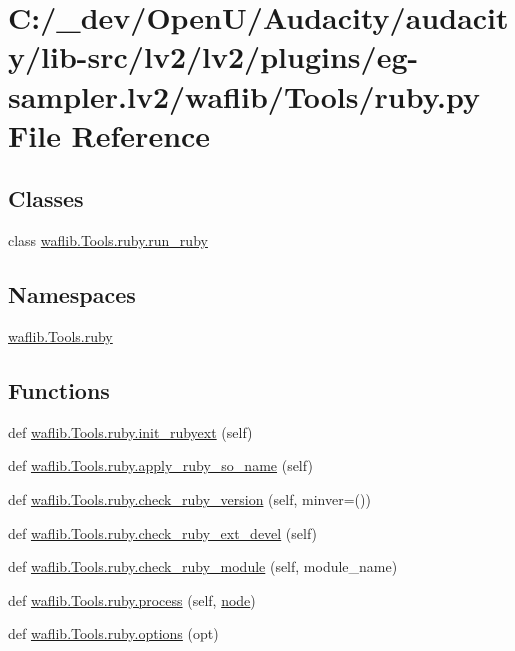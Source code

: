 \hypertarget{lv2_2plugins_2eg-sampler_8lv2_2waflib_2_tools_2ruby_8py}{}\section{C\+:/\+\_\+dev/\+Open\+U/\+Audacity/audacity/lib-\/src/lv2/lv2/plugins/eg-\/sampler.lv2/waflib/\+Tools/ruby.py File Reference}
\label{lv2_2plugins_2eg-sampler_8lv2_2waflib_2_tools_2ruby_8py}
\subsection*{Classes}
\begin{DoxyCompactItemize}
\item 
class \hyperlink{classwaflib_1_1_tools_1_1ruby_1_1run__ruby}{waflib.\+Tools.\+ruby.\+run\+\_\+ruby}
\end{DoxyCompactItemize}
\subsection*{Namespaces}
\begin{DoxyCompactItemize}
\item 
 \hyperlink{namespacewaflib_1_1_tools_1_1ruby}{waflib.\+Tools.\+ruby}
\end{DoxyCompactItemize}
\subsection*{Functions}
\begin{DoxyCompactItemize}
\item 
def \hyperlink{namespacewaflib_1_1_tools_1_1ruby_aefe90baeace8b05bd0038dec33a25d4f}{waflib.\+Tools.\+ruby.\+init\+\_\+rubyext} (self)
\item 
def \hyperlink{namespacewaflib_1_1_tools_1_1ruby_a91ccae4c2fd8fd022d9cf0b408b30ba5}{waflib.\+Tools.\+ruby.\+apply\+\_\+ruby\+\_\+so\+\_\+name} (self)
\item 
def \hyperlink{namespacewaflib_1_1_tools_1_1ruby_a6b1426d0a007a1d029dd549463f35792}{waflib.\+Tools.\+ruby.\+check\+\_\+ruby\+\_\+version} (self, minver=())
\item 
def \hyperlink{namespacewaflib_1_1_tools_1_1ruby_a1152f26b41ce01670cf061540c07642a}{waflib.\+Tools.\+ruby.\+check\+\_\+ruby\+\_\+ext\+\_\+devel} (self)
\item 
def \hyperlink{namespacewaflib_1_1_tools_1_1ruby_a56fd37d84970b70e399a27f937a3c8c6}{waflib.\+Tools.\+ruby.\+check\+\_\+ruby\+\_\+module} (self, module\+\_\+name)
\item 
def \hyperlink{namespacewaflib_1_1_tools_1_1ruby_abc8e4baeca74633f0dc718700b547b88}{waflib.\+Tools.\+ruby.\+process} (self, \hyperlink{structnode}{node})
\item 
def \hyperlink{namespacewaflib_1_1_tools_1_1ruby_a81332d72c1973177fb7f913b94ea205d}{waflib.\+Tools.\+ruby.\+options} (opt)
\end{DoxyCompactItemize}
